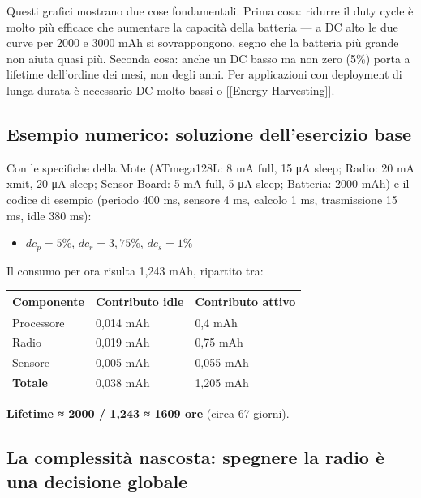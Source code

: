 \documentclass[
  italian,
  openany]{book}
\newcounter{none} %
\providecommand{\tightlist}{%
  \setlength{\itemsep}{0pt}\setlength{\parskip}{0pt}}
\begin{document}
Questi grafici mostrano due cose fondamentali. Prima cosa: ridurre il
duty cycle è molto più efficace che aumentare la capacità della batteria
--- a DC alto le due curve per 2000 e 3000 mAh si sovrappongono, segno
che la batteria più grande non aiuta quasi più. Seconda cosa: anche un
DC basso ma non zero (5\%) porta a lifetime dell'ordine dei mesi, non
degli anni. Per applicazioni con deployment di lunga durata è necessario
DC molto bassi o {[}{[}Energy Harvesting{]}{]}.

\subsection{Esempio numerico: soluzione dell'esercizio
base}\label{esempio-numerico-soluzione-dellesercizio-base}

Con le specifiche della Mote (ATmega128L: 8 mA full, 15 μA sleep; Radio:
20 mA xmit, 20 μA sleep; Sensor Board: 5 mA full, 5 μA sleep; Batteria:
2000 mAh) e il codice di esempio (periodo 400 ms, sensore 4 ms, calcolo
1 ms, trasmissione 15 ms, idle 380 ms):

\begin{itemize}
\tightlist
\item
  \(dc_p = 5\%\), \(dc_r = 3,75\%\), \(dc_s = 1\%\)
\end{itemize}

Il consumo per ora risulta 1,243 mAh, ripartito tra:

{\def\LTcaptype{none} %
\begin{longtable}[]{@{}lll@{}}
\toprule\noalign{}
Componente & Contributo idle & Contributo attivo \\
\midrule\noalign{}
\endhead
\bottomrule\noalign{}
\endlastfoot
Processore & 0,014 mAh & 0,4 mAh \\
Radio & 0,019 mAh & 0,75 mAh \\
Sensore & 0,005 mAh & 0,055 mAh \\
\textbf{Totale} & 0,038 mAh & 1,205 mAh \\
\end{longtable}
}

\textbf{Lifetime ≈ 2000 / 1,243 ≈ 1609 ore} (circa 67 giorni).

\subsection{La complessità nascosta: spegnere la radio è una decisione
globale}\label{la-complessituxe0-nascosta-spegnere-la-radio-uxe8-una-decisione-globale}
\end{document}
